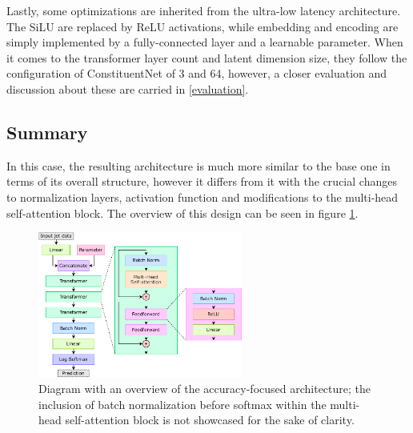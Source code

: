 Lastly, some optimizations are inherited from the ultra-low latency architecture. The SiLU are replaced by ReLU activations, while embedding and encoding are simply implemented by a fully-connected layer and a learnable parameter. When it comes to the transformer layer count and latent dimension size, they follow the configuration of ConstituentNet of 3 and 64, however, a closer evaluation and discussion about these are carried in \cref{evaluation}.

\subsection{Summary}
In this case, the resulting architecture is much more similar to the base one in terms of its overall structure, however it differs from it with the crucial changes to normalization layers, activation function and modifications to the multi-head self-attention block. The overview of this design can be seen in figure \ref{fig:constituent-net-accuracy}.

\begin{figure}[hpt!]
  \centering
  \includegraphics[trim={0cm 0cm 0cm 0cm}, width=0.6\textwidth, center]{models/constituent_net_accuracy.pdf}
  \caption{Diagram with an overview of the accuracy-focused architecture; the inclusion of batch normalization before softmax within the multi-head self-attention block is not showcased for the sake of clarity.}
  \label{fig:constituent-net-accuracy}
\end{figure}



